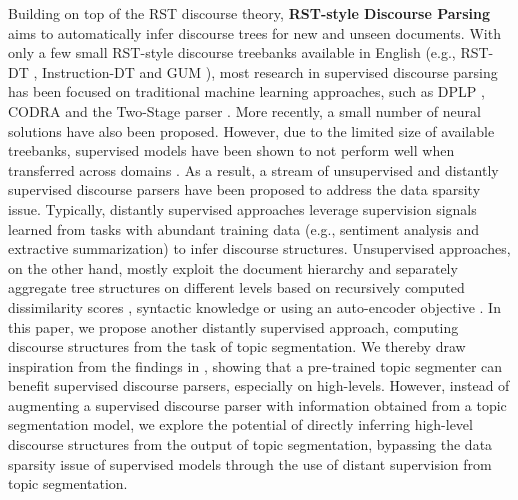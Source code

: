 \documentclass[letterpaper]{article} %
\begin{document}
Building on top of the RST discourse theory, \textbf{RST-style Discourse Parsing} aims to automatically infer discourse trees for new and unseen documents.
With only a few small RST-style discourse treebanks available in English (e.g., RST-DT \cite{carlson2002rst}, Instruction-DT \cite{subba-di-eugenio-2009-effective} and GUM \cite{Zeldes2017}), most research in supervised discourse parsing has been focused on traditional machine learning approaches, such as DPLP \cite{ji-eisenstein-2014-representation}, CODRA \cite{joty-etal-2015-codra} and the Two-Stage parser \cite{wang-etal-2017-two}. More recently, a small number of neural solutions \cite{yu-etal-2018-transition, kobayashi2020top, guz-carenini-2020-coreference, guz-carenini-2020-towards} have also been proposed. However, due to the limited size of available treebanks, supervised models have been shown to not perform well when transferred across domains \cite{huber-carenini-2020-mega}.
As a result, a stream of unsupervised \cite{kobayashi-etal-2019-split, nishida-nakayama-2020-unsupervised, huber2021unsupervised} and distantly supervised \cite{huber-carenini-2019-predicting, huber-carenini-2020-mega, xiao2021predicting} discourse parsers have been proposed to address the data sparsity issue. Typically, distantly supervised approaches leverage supervision signals learned from tasks with abundant training data (e.g., sentiment analysis and extractive summarization) to infer discourse structures. Unsupervised approaches, on the other hand, mostly exploit the document hierarchy and separately aggregate tree structures on different levels based on recursively computed dissimilarity scores \cite{kobayashi-etal-2019-split}, syntactic knowledge \cite{nishida-nakayama-2020-unsupervised} or using an auto-encoder objective \cite{huber2021unsupervised}. In this paper, we propose another distantly supervised approach, computing discourse structures from the task of topic segmentation.
We thereby draw inspiration from the findings in \citet{jiang2021hierarchical}, showing that a pre-trained topic segmenter can benefit supervised discourse parsers, especially on high-levels. However, instead of augmenting a supervised discourse parser with information obtained from a topic segmentation model, we explore the potential of directly inferring high-level discourse structures from the output of topic segmentation, bypassing the data sparsity issue of supervised
models through the use of distant supervision from topic segmentation.
\end{document}
